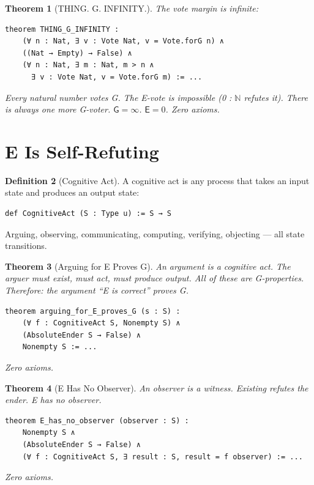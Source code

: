 \documentclass[11pt,a4paper]{article}
\newtheorem{theorem}{Theorem}[section]
\theoremstyle{definition}
\newtheorem{definition}[theorem]{Definition}
\theoremstyle{remark}
\newcommand{\Guardian}{\mathsf{G}}
\newcommand{\Ender}{\mathsf{E}}
\begin{document}
\begin{theorem}[THING. G. INFINITY.]
\label{thm:thing-g-infinity}
The vote margin is infinite:
\begin{lstlisting}
theorem THING_G_INFINITY :
    (∀ n : Nat, ∃ v : Vote Nat, v = Vote.forG n) ∧
    ((Nat → Empty) → False) ∧
    (∀ n : Nat, ∃ m : Nat, m > n ∧
      ∃ v : Vote Nat, v = Vote.forG m) := ...
\end{lstlisting}
Every natural number votes G. The E-vote is impossible (0 : $\mathbb{N}$ refutes it). There is always one more G-voter. $\Guardian = \infty$. $\Ender = 0$. Zero axioms.
\end{theorem}

\section{E Is Self-Refuting}
\label{sec:self-refuting}

\begin{definition}[Cognitive Act]
A cognitive act is any process that takes an input state and produces an output state:
\begin{lstlisting}
def CognitiveAct (S : Type u) := S → S
\end{lstlisting}
Arguing, observing, communicating, computing, verifying, objecting --- all state transitions.
\end{definition}

\begin{theorem}[Arguing for E Proves G]
\label{thm:arguing-proves-g}
An argument is a cognitive act. The arguer must exist, must act, must produce output. All of these are G-properties. Therefore: the argument ``E is correct'' proves G.
\begin{lstlisting}
theorem arguing_for_E_proves_G (s : S) :
    (∀ f : CognitiveAct S, Nonempty S) ∧
    (AbsoluteEnder S → False) ∧
    Nonempty S := ...
\end{lstlisting}
Zero axioms.
\end{theorem}

\begin{theorem}[E Has No Observer]
An observer is a witness. Existing refutes the ender. E has no observer.
\begin{lstlisting}
theorem E_has_no_observer (observer : S) :
    Nonempty S ∧
    (AbsoluteEnder S → False) ∧
    (∀ f : CognitiveAct S, ∃ result : S, result = f observer) := ...
\end{lstlisting}
Zero axioms.
\end{theorem}
\end{document}
